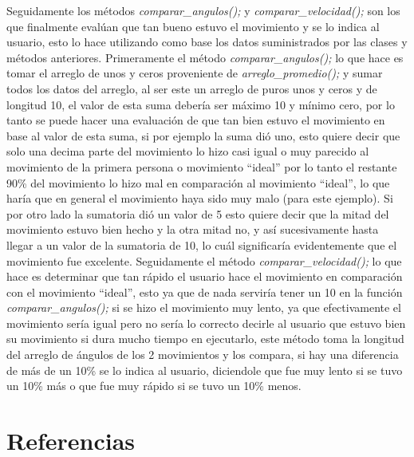 \documentclass[letterpaper]{article}
\begin{document}
Seguidamente los métodos \textit{comparar\_angulos();} y \textit{comparar\_velocidad();} son los que finalmente evalúan que tan bueno estuvo el movimiento y se lo indica al usuario, esto lo hace utilizando como base los datos suministrados por las clases y métodos anteriores. Primeramente el método \textit{comparar\_angulos();} lo que hace es tomar el arreglo de unos y ceros proveniente de \textit{arreglo_promedio();} y sumar todos los datos del arreglo, al ser este un arreglo de puros unos y ceros y de longitud 10, el valor de esta suma debería ser máximo 10 y mínimo cero, por lo tanto se puede hacer una evaluación de que tan bien estuvo 
el movimiento en base al valor de esta suma, si por ejemplo la suma dió uno, esto quiere decir que solo una decima parte del movimiento lo hizo casi igual o muy parecido al movimiento de la primera persona o movimiento ``ideal'' por lo tanto el restante 90\% del movimiento lo hizo mal en comparación al movimiento ``ideal'', lo que haría que en general el movimiento haya sido muy malo (para este ejemplo). Si por otro lado la sumatoria dió un valor de 5 esto quiere decir que la mitad del movimiento estuvo bien hecho y la otra mitad no, y así sucesivamente hasta llegar a un valor de la sumatoria de 10, lo cuál significaría evidentemente que el movimiento fue excelente. Seguidamente el método \textit{comparar\_velocidad();} 
lo que hace es determinar que tan rápido el usuario hace el movimiento en comparación con el movimiento ``ideal'', esto ya que de nada serviría tener un 10 en la función \textit{comparar\_angulos();} si se hizo el movimiento muy lento, ya que efectivamente el movimiento sería igual pero no sería lo correcto decirle al usuario que estuvo bien su movimiento si dura mucho tiempo en ejecutarlo, este método toma la longitud del arreglo de ángulos de los 2 movimientos y los compara, si hay una diferencia de más de un 10\% se lo indica al usuario, diciendole que fue muy lento si se tuvo un 10\% más o que fue muy rápido si se tuvo un 10\% menos. \\


\section{Referencias}
\end{document}

